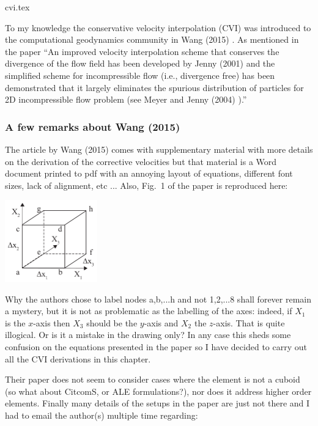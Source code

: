 \begin{flushright} {\tiny {\color{gray} cvi.tex}} \end{flushright}


To my knowledge the conservative velocity interpolation (CVI) was introduced to 
the computational geodynamics community in Wang \etal (2015) \cite{waav15}. 
As mentioned in the paper 
``An improved velocity interpolation scheme that conserves the divergence of the flow field has 
been developed by Jenny \etal (2001) \cite{jepm01} and the simplified scheme for incompressible 
flow (i.e., divergence free) has been demonstrated that it largely eliminates the spurious 
distribution of particles for 2D incompressible flow problem (see Meyer and Jenny (2004) \cite{meje04}).''

\subsubsection{A few remarks about Wang \etal (2015)}

The article by Wang \etal (2015) comes with supplementary material with more details on the 
derivation of the corrective velocities but that material is a Word
document printed to pdf with an annoying layout of equations, different font sizes,
lack of alignment, etc ... 
Also, Fig.~1 of the paper is reproduced here:
\begin{center}
\includegraphics[width=4cm]{images/cvi/wang15}
\end{center}
Why the authors chose to label nodes a,b,...h and not 1,2,...8 shall forever remain 
a mystery, but it is not as problematic as the labelling of the axes:
indeed, if $X_1$ is the $x$-axis then $X_3$ should be the $y$-axis 
and $X_2$ the $z$-axis. That is quite illogical. Or is it a mistake in 
the drawing only? In any case this sheds some confusion on the equations 
presented in the paper so I have decided to carry out all the CVI derivations 
in this chapter.

Their paper does not seem to consider cases where the element is not a 
cuboid (so what about CitcomS, or ALE formulations?), nor does it address higher order elements. 
Finally many details of the setups in the paper are just not there and I had to 
email the author(s) multiple time regarding:

